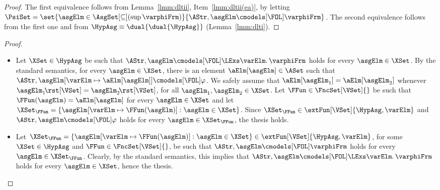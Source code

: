 \documentclass[authoryear]{elsarticle}
\begin{document}
\lmmfoldlt*
%

\begin{proof}
%
  The first equivalence follows from Lemma~\ref{lmm:dltii},
  Item~\ref{lmm:dltii(ea)}, by letting $\PsiSet = \set{\asgElm \in
    \AsgSet[\subseteq](\sup{\varphiFrm})}{ \AStr, \asgElm \cmodels[\FOL] \varphiFrm }$.
  The second equivalence follows from the first one and from $\HypAsg \equiv
  \dual{\dual{\HypAsg}}$ (Lemma~\ref{lmm:dlti}).
%
\end{proof}

\lmmfolqnt*
%
\begin{proof}

  \begin{itemize}
  \item[($\ref{lmm:folqnt(ea:org)} \Rightarrow \ref{lmm:folqnt(ea:ext)}$)] Let
    $\XSet \in \HypAsg$ be such that $\AStr, \asgElm \cmodels[\FOL] \LExs
    \varElm \ldotp \varphiFrm$ holds for every $\asgElm \in \XSet$. By the
    standard \FOL semantics, for every $\asgElm \in \XSet$, there is an element
    $\aElm[\asgElm] \in \ASet$ such that $\AStr, {\asgElm}[\varElm \mapsto
    \aElm[\asgElm]] \cmodels[\FOL] \varphi$.
    We safely assume that $\aElm[\asgElm_1] = \aElm[\asgElm_2]$ whenever
    $\asgElm_1 \!\rst[\VSet] = \asgElm_2 \!\rst[\VSet]$, for all $\asgElm_1,
    \asgElm_2 \in \XSet$.
    Let $\FFun \in \FncSet[\VSet]{}$ be such that $\FFun(\asgElm) =
    \aElm[\asgElm]$ for every $\asgElm \in \XSet$ and let $\XSet_{\FFun} = \{
    {\asgElm}[\varElm \mapsto \FFun(\asgElm)] : \asgElm \in \XSet \}$.
    Since $\XSet_{\FFun} \in \extFun[\VSet]{\HypAsg, \varElm}$ and $\AStr,
    \asgElm \cmodels[\FOL] \varphi$ holds for every $\asgElm \in \XSet_{\FFun}$,
    the thesis holds.

  \item[($\ref{lmm:folqnt(ea:ext)} \Rightarrow \ref{lmm:folqnt(ea:org)}$)] Let
    $\XSet_{\FFun} = \{ {\asgElm}[\varElm \mapsto \FFun(\asgElm)] : \asgElm \in
    \XSet \} \in \extFun[\VSet]{\HypAsg, \varElm}$, for some $\XSet \in \HypAsg$
    and $\FFun \in \FncSet[\VSet]{}$, be such that $\AStr, \asgElm
    \cmodels[\FOL] \varphiFrm$ holds for every $\asgElm \in \XSet_{\FFun}$.
%
%
    Clearly, by the standard \FOL semantics, this implies that $\AStr, \asgElm
    \cmodels[\FOL] \LExs \varElm \ldotp \varphiFrm$ holds for every $\asgElm \in
    \XSet$, hence the thesis.


\end{itemize}
\end{proof}
\end{document}

